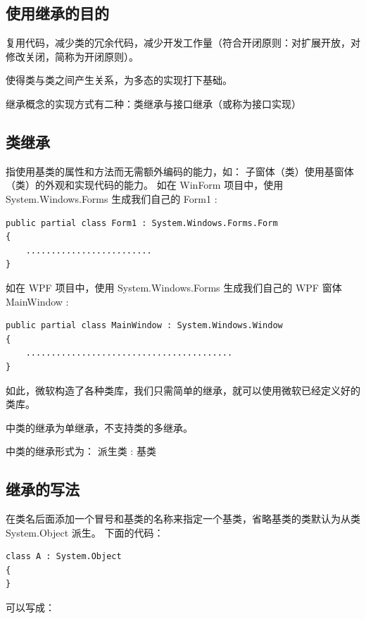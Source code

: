 \subsection{使用继承的目的}

复用代码，减少类的冗余代码，减少开发工作量（符合开闭原则：对扩展开放，对修改关闭，简称为开闭原则）。

使得类与类之间产生关系，为多态的实现打下基础。

继承概念的实现方式有二种：类继承与接口继承（或称为接口实现）


\subsection{ \cs 类继承}

指使用基类的属性和方法而无需额外编码的能力，如：
子窗体（类）使用基窗体（类）的外观和实现代码的能力。
如在 WinForm 项目中，使用 System.Windows.Forms 生成我们自己的 Form1 :

\begin{lstlisting}
public partial class Form1 : System.Windows.Forms.Form
{
	.........................   
}
\end{lstlisting}

如在 WPF 项目中，使用 System.Windows.Forms 生成我们自己的 WPF 窗体 MainWindow :

\begin{lstlisting}
public partial class MainWindow : System.Windows.Window
{
	.........................................
}
\end{lstlisting}

如此，微软构造了各种类库，我们只需简单的继承，就可以使用微软已经定义好的类库。

\cs 中类的继承为单继承，不支持类的多继承。

\cs 中类的继承形式为： 派生类 : 基类


\subsection{继承的写法}

在类名后面添加一个冒号和基类的名称来指定一个基类，省略基类的类默认为从类 System.Object 派生。
下面的代码：

\begin{lstlisting}
class A : System.Object
{
}
\end{lstlisting}

可以写成：

